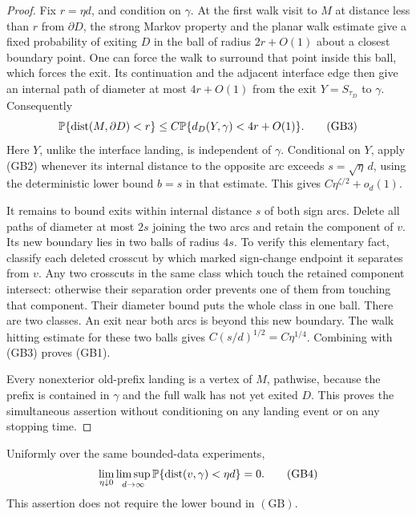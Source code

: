 \begin{proof}
Fix \(r=\eta d\), and condition on \(\gamma\). At the first walk
visit to \(M\) at distance less than \(r\) from \(\partial D\),
the strong Markov property and the planar walk estimate give a
fixed probability of exiting \(D\) in the ball of radius \(2r+O(1)\)
about a closest boundary point. One can force the walk to surround
that point inside this ball, which forces the exit. Its continuation
and the adjacent interface edge then give an internal path of diameter
at most \(4r+O(1)\) from the exit \(Y=S_{\tau_D}\) to \(\gamma\).
Consequently
\[
 \mathbb P\{\operatorname{dist}(M,\partial D)<r\}
 \leq C\mathbb P\{d_D(Y,\gamma)<4r+O(1)\}.             \tag{GB3}
\]
Here \(Y\), unlike the interface landing, is independent of
\(\gamma\). Conditional on \(Y\), apply (GB2) whenever its internal
distance to the opposite arc exceeds \(s=\sqrt\eta\,d\), using
the deterministic lower bound \(b=s\) in that estimate. This gives
\(C\eta^{\zeta/2}+o_d(1)\).

It remains to bound exits within internal distance \(s\) of both
sign arcs. Delete all paths of diameter at most \(2s\) joining the
two arcs and retain the component of \(v\). Its new boundary lies
in two balls of radius \(4s\). To verify this elementary fact,
classify each deleted crosscut by which marked sign-change endpoint
it separates from \(v\). Any two crosscuts in the same class which
touch the retained component intersect: otherwise their separation
order prevents one of them from touching that component. Their
diameter bound puts the whole class in one ball. There are two
classes. An exit near both arcs is beyond this new boundary.
The walk hitting estimate for these two balls gives
\(C(s/d)^{1/2}=C\eta^{1/4}\). Combining with (GB3) proves (GB1).

Every nonexterior old-prefix landing is a vertex of \(M\), pathwise,
because the prefix is contained in \(\gamma\) and the full walk has
not yet exited \(D\). This proves the simultaneous assertion without
conditioning on any landing event or on any stopping time.
\end{proof}

\begin{lemma}\label{g:observer-landing}
Uniformly over the same bounded-data experiments,
\[
 \lim_{\eta\downarrow0}\limsup_{d\to\infty}
 \mathbb P\{\operatorname{dist}(v,\gamma)<\eta d\}=0.     \tag{GB4}
\]
This assertion does not require the lower bound in \((\mathrm{GB})\).
\end{lemma}

